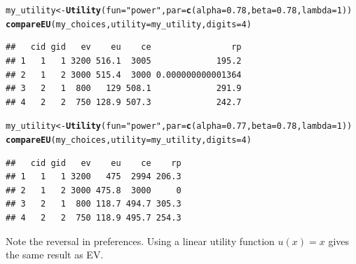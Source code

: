 \documentclass{article}\usepackage[]{graphicx}\usepackage[]{color}
\makeatletter
\newcommand{\hlnum}[1]{\textcolor[rgb]{0.686,0.059,0.569}{#1}}%
\newcommand{\hlstr}[1]{\textcolor[rgb]{0.192,0.494,0.8}{#1}}%
\newcommand{\hlstd}[1]{\textcolor[rgb]{0.345,0.345,0.345}{#1}}%
\newcommand{\hlkwb}[1]{\textcolor[rgb]{0.69,0.353,0.396}{#1}}%
\newcommand{\hlkwc}[1]{\textcolor[rgb]{0.333,0.667,0.333}{#1}}%
\newcommand{\hlkwd}[1]{\textcolor[rgb]{0.737,0.353,0.396}{\textbf{#1}}}%
\newenvironment{kframe}{%
 \def\at@end@of@kframe{}%
 \ifinner\ifhmode%
  \def\at@end@of@kframe{\end{minipage}}%
  \begin{minipage}{\columnwidth}%
 \fi\fi%
 \def\FrameCommand##1{\hskip\@totalleftmargin \hskip-\fboxsep
 \colorbox{shadecolor}{##1}\hskip-\fboxsep
     \hskip-\linewidth \hskip-\@totalleftmargin \hskip\columnwidth}%
 \MakeFramed {\advance\hsize-\width
   \@totalleftmargin\z@ \linewidth\hsize
   \@setminipage}}%
 {\par\unskip\endMakeFramed%
 \at@end@of@kframe}
\newenvironment{knitrout}{}{} %
\makeatother
\begin{document}
\begin{knitrout}
\color{fgcolor}\begin{kframe}
\begin{alltt}
\hlstd{my_utility} \hlkwb{<-} \hlkwd{Utility}\hlstd{(}\hlkwc{fun}\hlstd{=}\hlstr{"power"}\hlstd{,} \hlkwc{par}\hlstd{=}\hlkwd{c}\hlstd{(}\hlkwc{alpha}\hlstd{=}\hlnum{0.78}\hlstd{,} \hlkwc{beta}\hlstd{=}\hlnum{0.78}\hlstd{,} \hlkwc{lambda}\hlstd{=}\hlnum{1}\hlstd{))}
\hlkwd{compareEU}\hlstd{(my_choices,} \hlkwc{utility}\hlstd{=my_utility,} \hlkwc{digits}\hlstd{=}\hlnum{4}\hlstd{)}
\end{alltt}
\begin{verbatim}
##   cid gid   ev    eu    ce                rp
## 1   1   1 3200 516.1  3005             195.2
## 2   1   2 3000 515.4  3000 0.000000000001364
## 3   2   1  800   129 508.1             291.9
## 4   2   2  750 128.9 507.3             242.7
\end{verbatim}
\end{kframe}
\end{knitrout}


\begin{knitrout}
\color{fgcolor}\begin{kframe}
\begin{alltt}
\hlstd{my_utility} \hlkwb{<-} \hlkwd{Utility}\hlstd{(}\hlkwc{fun}\hlstd{=}\hlstr{"power"}\hlstd{,} \hlkwc{par}\hlstd{=}\hlkwd{c}\hlstd{(}\hlkwc{alpha}\hlstd{=}\hlnum{0.77}\hlstd{,} \hlkwc{beta}\hlstd{=}\hlnum{0.78}\hlstd{,} \hlkwc{lambda}\hlstd{=}\hlnum{1}\hlstd{))}
\hlkwd{compareEU}\hlstd{(my_choices,} \hlkwc{utility}\hlstd{=my_utility,} \hlkwc{digits}\hlstd{=}\hlnum{4}\hlstd{)}
\end{alltt}
\begin{verbatim}
##   cid gid   ev    eu    ce    rp
## 1   1   1 3200   475  2994 206.3
## 2   1   2 3000 475.8  3000     0
## 3   2   1  800 118.7 494.7 305.3
## 4   2   2  750 118.9 495.7 254.3
\end{verbatim}
\end{kframe}
\end{knitrout}


Note the reversal in preferences. Using a linear utility function $u(x) = x$ gives the same result as EV.
\end{document}
